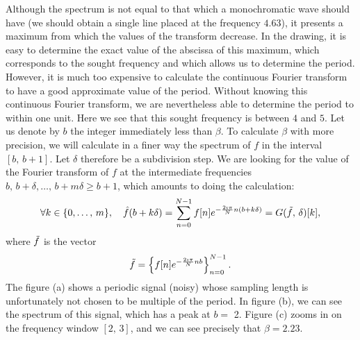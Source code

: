 Although the spectrum is not equal to that which a monochromatic wave should have (we should obtain a single line placed at the frequency $ 4.63 $), it presents a maximum from which the values of the transform decrease. In the drawing, it is easy to determine the exact value of the abscissa of this maximum, which corresponds to the sought frequency and which allows us to determine the period. However, it is much too expensive to calculate the continuous Fourier transform to have a good approximate value of the period. Without knowing this continuous Fourier transform, we are nevertheless able to determine the period to within one unit. Here we see that this sought frequency is between $ 4 $ and $ 5 $. Let us denote by $ b $ the integer immediately less than $ \beta $. To calculate $ \beta $ with more precision, we will calculate in a finer way the spectrum of $ f $ in the interval $ [b, \, b + 1] $. Let $ \delta $ therefore be a subdivision step. We are looking for the value of the Fourier transform of $ f $ at the intermediate frequencies $ b, \, b + \delta, \ldots, \, b + m \delta \ge b + 1 $, which amounts to doing the calculation:
\begin{equation*}
\forall k \in \{0, \ldots, \, m \}, \quad \hat{f} (b + k \delta) = \sum_{n = 0}^{N-1}{f [n ] e^{- \frac{2 \imath \pi}{N} n (b + k \delta)}} = G (\tilde{f}, \, \delta) [k],
\end{equation*}
where $ \tilde{f} $ is the vector
\begin{equation*}
\tilde{f} = \left\{f [n] e^{- \frac{2 \imath \pi}{N} nb} \right\}_{n = 0}^{N-1}.
\end{equation*}
The figure  (a) shows a periodic signal (noisy) whose sampling length is unfortunately not chosen to be multiple of the period. In figure (b), we can see the spectrum of this signal, which has a peak at $ b = $ 2. Figure (c) zooms in on the frequency window $ [2, \, 3] $, and we can see precisely that $ \beta = 2.23 $.
 
